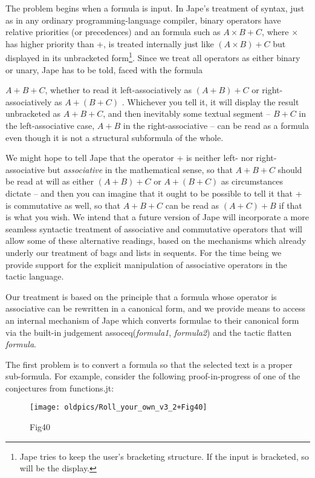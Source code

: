 \documentclass[11pt]{book}
\begin{document}
The problem begins when a formula is input. In Jape's treatment of syntax, just as in any ordinary programming-language compiler, binary operators have relative priorities (or precedences) and an formula such as $A\times B+C$, where \ensuremath{\times} has higher priority than +, is treated internally just like $(A\times B)+C$ but displayed in its unbracketed form\footnote{Jape tries to keep the user's bracketing structure. If the input is bracketed, so will be the display.}. Since we treat all operators as either binary or unary, Jape has to be told, faced with the formula

$A+B+C$, whether to read it left-associatively as $(A+B)+C$ or right-associatively as $A+(B+C)$ . Whichever you tell it, it will display the result unbracketed as $A+B+C$, and then inevitably some textual segment -- $B+C$ in the left-associative case, $A+B$ in the right-associative -- can be read as a formula even though it is not a structural subformula of the whole.


We might hope to tell Jape that the operator + is neither left- nor right-associative but \textit{associative} in the mathematical sense, so that $A+B+C$ should be read at will as either $(A+B)+C$ or $A+(B+C)$ as circumstances dictate -- and then you can imagine that it ought to be possible to tell it that + is commutative as well, so that $A+B+C$ can be read as $(A+C)+B$ if that is what you wish. We intend that a future version of Jape will incorporate a more seamless syntactic treatment of associative and commutative operators that will allow some of these alternative readings, based on the mechanisms which already underly our treatment of bags and lists in sequents. For the time being we provide support for the explicit manipulation of associative operators in the tactic language.


Our treatment is based on the principle that a formula whose operator is associative can be rewritten in a canonical form, and we provide means to access an internal mechanism of Jape which converts formulae to their canonical form via the built-in judgement assoceq(\textit{formula1}, \textit{formula2}) and the tactic flatten \textit{formula}.


The first problem is to convert a formula so that the selected text is a proper sub-formula. For example, consider the following proof-in-progress of one of the conjectures from functions.jt:

\begin{figure}[htbp] \begin{center} \texttt{[image: oldpics/Roll\_your\_own\_v3\_2+Fig40]} \caption{Fig40} \end{center} \end{figure}
\end{document}
